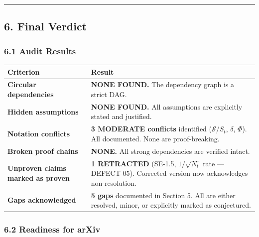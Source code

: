 \documentclass[
  12pt,
]{article}
\begin{document}
\begin{center}\rule{0.5\linewidth}{0.5pt}\end{center}

\subsection{6. Final Verdict}\label{final-verdict}

\subsubsection{6.1 Audit Results}\label{audit-results}

\begin{longtable}[]{@{}
  >{\raggedright\arraybackslash}p{}
  >{\raggedright\arraybackslash}p{}@{}}
\toprule\noalign{}
\begin{minipage}[b]{\linewidth}\raggedright
Criterion
\end{minipage} & \begin{minipage}[b]{\linewidth}\raggedright
Result
\end{minipage} \\
\midrule\noalign{}
\endhead
\bottomrule\noalign{}
\endlastfoot
\textbf{Circular dependencies} & \textbf{NONE FOUND.} The dependency
graph is a strict DAG. \\
\textbf{Hidden assumptions} & \textbf{NONE FOUND.} All assumptions are
explicitly stated and justified. \\
\textbf{Notation conflicts} & \textbf{3 MODERATE conflicts} identified
(\(\mathcal{S}\)/\(S_t\), \(\delta\), \(\Phi\)). All documented. None
are proof-breaking. \\
\textbf{Broken proof chains} & \textbf{NONE.} All strong dependencies
are verified intact. \\
\textbf{Unproven claims marked as proven} & \textbf{1 RETRACTED}
(SE-1.5, \(1/\sqrt{N_t}\) rate --- DEFECT-05). Corrected version now
acknowledges non-resolution. \\
\textbf{Gaps acknowledged} & \textbf{5 gaps} documented in Section 5.
All are either resolved, minor, or explicitly marked as conjectured. \\
\end{longtable}

\subsubsection{6.2 Readiness for arXiv}\label{readiness-for-arxiv}
\end{document}
